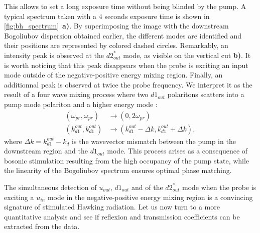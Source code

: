 This allows to set a long exposure time without being blinded by the pump. A typical spectrum taken with a 4 seconds exposure time is shown in \autoref{fig:bh_spectrum}~\textbf{a)}. By superimposing the image with the downstream Bogoliubov dispersion obtained earlier, the different modes are identified and their positions 
are represented by colored dashed circles. Remarkably, an intensity peak is observed at the $d2_{out}^*$ mode, as visible on the vertical cut \textbf{b)}. It is worth noticing that this peak disappears when the probe 
is exciting an input mode outside of the negative-positive energy mixing region. Finally, an additionnal peak is observed at twice the probe frequency. We interpret it 
as the result of a four wave mixing process where two $d1_{out}$ polaritons scatters into a pump mode polariton and a higher energy mode :
\begin{equation}
    \begin{aligned}
    (\omega_{pr}, \omega_{pr}) &\to (0, 2\omega_{pr}) \\
    (k_{d1}^{out}, k_{d1}^{out}) &\to (k_{d1}^{out}-\Delta k,k_{d1}^{out}+\Delta k),
    \end{aligned}
    \label{eq:higher_order_four_wave_mixing}
\end{equation}
where $\Delta k= k_{d1}^{out}-k_d$ is the wavevector mismatch between the pump in the downstream region and the $d1_{out}$ mode. This process arises as a consequence of bosonic stimulation resulting from the high occupancy of the pump state, while the linearity of the Bogoliubov spectrum ensures optimal phase matching.

\bigskip

The simultaneous detection of $u_{out}$, $d1_{out}$ and of the $d2_{out}^*$ mode when the probe is exciting a $u_{in}$ mode in the negative-positive energy mixing region is a convincing signature of stimulated Hawking radiation.
Let us now turn to a more quantitative analysis and see if reflexion and transmission coefficients can be extracted from the data.


